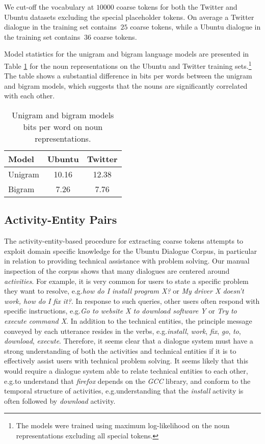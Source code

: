 \documentclass{article}
\begin{document}
We cut-off the vocabulary at $10000$ coarse tokens for both the Twitter and Ubuntu datasets excluding the special placeholder tokens. On average a Twitter dialogue in the training set contains $~25$ coarse tokens, while a Ubuntu dialogue in the training set contains $~36$ coarse tokens.

Model statistics for the unigram and bigram language models are presented in Table \ref{table:noun-rep-bits-per-word} for the noun representations on the Ubuntu and Twitter training sets.\footnote{The models were trained using maximum log-likelihood on the noun representations excluding all special tokens.}
The table shows a substantial difference in bits per words between the unigram and bigram models, which suggests that the nouns are significantly correlated with each other.

\begin{table}[t]
  \caption{Unigram and bigram models bits per word on noun representations.}
  \label{table:noun-rep-bits-per-word}
  \small
  \centering
  \begin{tabular}{lcc}
    \toprule
    Model & \textbf{Ubuntu} & \textbf{Twitter} \\ 
    \midrule
    Unigram & 10.16 & 12.38 \\
    Bigram & 7.26 & 7.76 \\
    \bottomrule
  \end{tabular}
 \end{table}
 
\subsection*{Activity-Entity Pairs}

The activity-entity-based procedure for extracting coarse tokens attempts to exploit domain specific knowledge for the Ubuntu Dialogue Corpus, in particular in relation to providing technical assistance with problem solving. Our manual inspection of the corpus shows that many dialogues are centered around \textit{activities}. For example, it is very common for users to state a specific problem they want to resolve, e.g.\@ \textit{how do I install program X?} or \textit{My driver X doesn't work, how do I fix it?}. In response to such queries, other users often respond with specific instructions, e.g.\@ \textit{Go to website X to download software Y} or \textit{Try to execute command X}. In addition to the technical entities, the principle message conveyed by each utterance resides in the verbs, e.g.\@ \textit{install}, \textit{work}, \textit{fix}, \textit{go}, \textit{to}, \textit{download}, \textit{execute}. Therefore, it seems clear that a dialogue system must have a strong understanding of both the activities and technical entities if it is to effectively assist users with technical problem solving. It seems likely that this would require a dialogue system able to relate technical entities to each other, e.g.\@ to understand that \textit{firefox} depends on the \textit{GCC} library, and conform to the temporal structure of activities, e.g.\@ understanding that the \textit{install} activity is often followed by \textit{download} activity.
\end{document}
